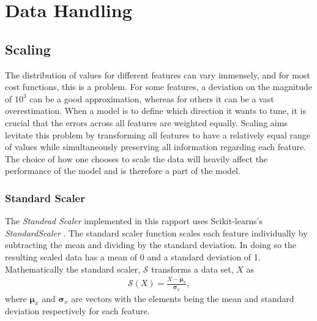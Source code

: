 \section{Data Handling}\label{subsec:Scaling}
\subsection{Scaling}
The distribution of values for different features can vary immensely, and for most 
cost functions, this is a problem. For some features, a deviation on the magnitude 
of $10^3$ can be a good approximation, whereas for others it can be a vast 
overestimation. When a model is to define which direction it wants to tune, it is 
crucial that the errors across all features are weighted equally. Scaling aims levitate 
this problem by transforming all features to have a relatively equal range of values while
simultaneously preserving all information regarding each feature. The choice of how one 
chooses to scale the data will heavily affect the performance of the model and is therefore
a part of the model. 
\\
\subsubsection{Standard Scaler}
The \emph{Standrad Scaler} implemented in this rapport uses Scikit-learns's \emph{StandardScaler}
\cite{StandardScaler}. The standard scaler function scales each feature individually by subtracting 
the mean and dividing by the standard deviation. In doing so the resulting scaled data has a mean 
of 0 and a standard deviation of 1. Mathematically the standard scaler, $\mathcal{S}$ transforms 
a data set, $X$ as 
\begin{align}
    \mathcal{S} \left(X\right) = \frac{X - \boldsymbol{\mu} _x}{\boldsymbol{\sigma}_x} ,
\end{align}
where $\boldsymbol{\mu} _x$ and $\boldsymbol{\sigma}_x$ are vectors with the elements being 
the mean and standard deviation respectively for each feature.

